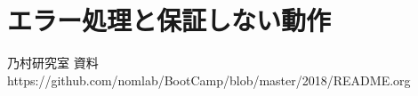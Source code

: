 \documentclass[12pt]{jsarticle}
\begin{document}
\section{エラー処理と保証しない動作}



\begin{thebibliography}{1}
   乃村研究室 資料　https:\slash{}\slash{}github.com\slash{}nomlab\slash{}BootCamp\slash{}blob\slash{}master\slash{}2018\slash{}README.org
\end{thebibliography}

%
%
\end{document}
